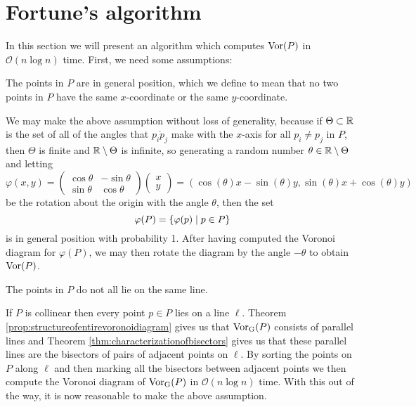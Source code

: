 \section{Fortune's algorithm}
In this section we will present an algorithm which computes $\operatorname{Vor}(P)$ in $\mathcal{O}(n \log n)$ time. First, we need some assumptions:

\begin{assume} \label{ass:generalposition}
The points in $P$ are in general position, which we define to mean that no two points in $P$ have the same $x$-coordinate or the same $y$-coordinate.
\end{assume}

\begin{rmk}
We may make the above assumption without loss of generality, because if $\Theta \subset \mathbb{R}$ is the set of all of the angles that $\overline{p_i p_j}$ make with the $x$-axis for all $p_i \ne p_j$ in $P$, then $\Theta$ is finite and $\mathbb{R} \setminus \Theta$ is infinite, so generating a random number $\theta \in \mathbb{R} \setminus \Theta$ and letting
\[
    \varphi (x, y) = \begin{pmatrix} \cos \theta & -\sin \theta \\ \sin \theta & \cos \theta \end{pmatrix} \begin{pmatrix} x \\ y \end{pmatrix}
    = (\cos(\theta) x - \sin(\theta) y, \sin(\theta) x + \cos(\theta) y)
\]
be the rotation about the origin with the angle $\theta$, then the set
\[
    \varphi(P) = \{\varphi(p) \mid p \in P\}
\]
is in general position with probability 1. After having computed the Voronoi diagram for $\varphi(P)$, we may then rotate the diagram by the angle $-\theta$ to obtain $\operatorname{Vor}(P)$.
\end{rmk}

\begin{assume} \label{ass:notsameline}
The points in $P$ do not all lie on the same line.
\end{assume}

\begin{rmk}
If $P$ is collinear then every point $p \in P$ lies on a line $\ell$. Theorem \ref{prop:structureofentirevoronoidiagram} gives us that $\operatorname{Vor_{G}}(P)$ consists of parallel lines and Theorem \ref{thm:characterizationofbisectors} gives us that these parallel lines are the bisectors of pairs of adjacent points on $\ell$. By sorting the points on $P$ along $\ell$ and then marking all the bisectors between adjacent points we then compute the Voronoi diagram of $\operatorname{Vor_{G}}(P)$ in $\mathcal{O}(n \log n)$ time. With this out of the way, it is now reasonable to make the above assumption.
\end{rmk}


